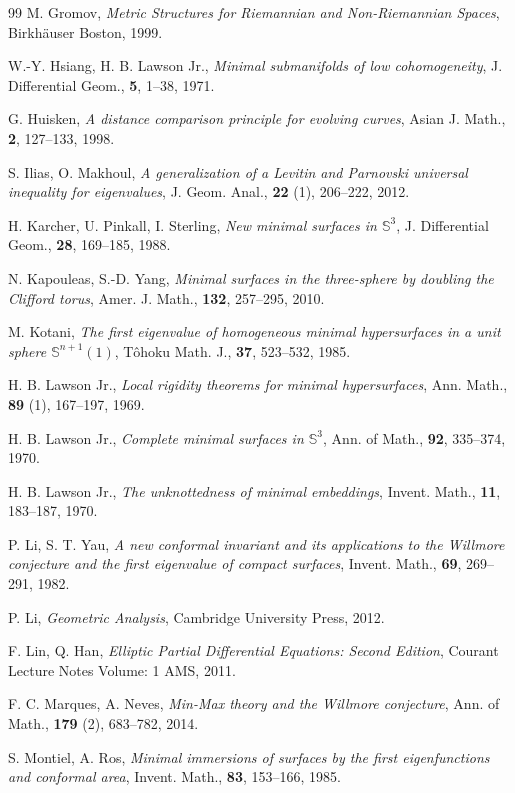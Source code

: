 \documentclass[a4, 12pt]{amsart}
\numberwithin{equation}{section} \numberwithin{equation}{section}
\begin{document}
\begin{thebibliography}{99}
M. Gromov, \textit{Metric Structures for Riemannian and Non-Riemannian Spaces}, Birkh\"{a}user Boston, 1999.

W.-Y. Hsiang, H. B. Lawson Jr., \textit{Minimal submanifolds of low cohomogeneity}, J. Differential Geom., {\bf 5}, 1--38, 1971.

G. Huisken, \textit{A distance comparison principle for evolving curves}, Asian J. Math., {\bf 2}, 127--133, 1998.

S. Ilias, O. Makhoul, \textit{A generalization of a Levitin and Parnovski universal inequality for eigenvalues}, J. Geom. Anal., {\bf 22} (1), 206--222, 2012.

H. Karcher, U. Pinkall, I. Sterling, \textit{New minimal surfaces in $\mathbb{S}^3$}, J. Differential Geom., {\bf 28}, 169--185, 1988.

N. Kapouleas, S.-D. Yang, \textit{Minimal surfaces in the three-sphere by doubling the Clifford torus}, Amer. J. Math., {\bf 132}, 257--295, 2010.

M. Kotani, \textit{The first eigenvalue of homogeneous minimal hypersurfaces in a unit sphere $\mathbb{S}^{n+1}(1)$}, T\^{o}hoku Math. J., {\bf 37}, 523--532, 1985.

H. B. Lawson Jr., \textit{Local rigidity theorems for minimal hypersurfaces}, Ann. Math., {\bf 89} (1), 167--197, 1969.

H. B. Lawson Jr., \textit{Complete minimal surfaces in $\mathbb{S}^3$}, Ann. of Math., {\bf 92}, 335--374, 1970.

H. B. Lawson Jr., \textit{The unknottedness of minimal embeddings}, Invent. Math., {\bf 11}, 183--187, 1970.

P. Li, S. T. Yau, \textit{A new conformal invariant and its applications to the Willmore conjecture and the first eigenvalue of compact surfaces}, Invent. Math., {\bf 69}, 269--291, 1982.

P. Li, \textit{Geometric Analysis}, Cambridge University Press, 2012.

F. Lin, Q. Han, \textit{Elliptic Partial Differential Equations: Second Edition}, Courant Lecture Notes Volume: 1 AMS, 2011.

F. C. Marques, A. Neves, \textit{Min-Max theory and the Willmore conjecture}, Ann. of Math., {\bf 179} (2), 683--782, 2014.

S. Montiel, A. Ros, \textit{Minimal immersions of surfaces by the first eigenfunctions and conformal area}, Invent. Math., {\bf 83}, 153--166, 1985.


\end{thebibliography}
\end{document}
